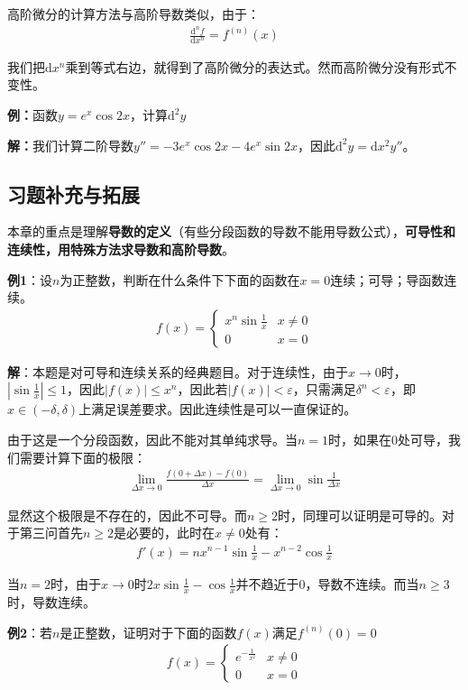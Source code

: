\documentclass{ctexart}
\let\oldtextbf\textbf %
\renewcommand{\textbf}[1]{\textcolor{btex}{\oldtextbf{#1}}} %
\begin{document}
高阶微分的计算方法与高阶导数类似，由于：
\begin{align*}
    \frac{\mathrm{d}^n f}{\mathrm{d}x^n}=f^{(n)}(x)
\end{align*}

我们把$\mathrm{d}x^n$乘到等式右边，就得到了高阶微分的表达式。然而高阶微分没有形式不变性。

\textbf{例：}函数$y=e^x\cos 2x$，计算$\mathrm{d}^2y$

\textbf{解：}我们计算二阶导数$y''=-3e^x\cos 2x-4e^x\sin 2x$，因此$\mathrm{d}^2y=\mathrm{d}x^2 y''$。

\subsection{习题补充与拓展}
本章的重点是理解\textbf{导数的定义}（有些分段函数的导数不能用导数公式），\textbf{可导性和连续性，用特殊方法求导数和高阶导数}。

\textbf{例1}：设$n$为正整数，判断在什么条件下下面的函数在$x=0$连续；可导；导函数连续。
\begin{align*}
    f(x)=\begin{cases}
        x^n\sin\frac{1}{x} & x\neq 0\\
        0 &x=0
    \end{cases}
\end{align*}

\textbf{解}：本题是对可导和连续关系的经典题目。对于连续性，由于$x\to 0$时，$|\sin \frac{1}{x}|\leq 1$，因此$|f(x)|\leq x^n$，因此若$|f(x)|<\varepsilon$，只需满足$\delta^n<\varepsilon$，即$x\in(-\delta,\delta)$上满足误差要求。因此连续性是可以一直保证的。

由于这是一个分段函数，因此不能对其单纯求导。当$n=1$时，如果在0处可导，我们需要计算下面的极限：
\begin{align*}
     \lim_{\Delta x\to 0}\frac{f(0+\Delta x)-f(0)}{\Delta x}=  \lim_{\Delta x\to 0}\sin \frac{1}{\Delta x}
\end{align*}

显然这个极限是不存在的，因此不可导。而$n\geq 2$时，同理可以证明是可导的。对于第三问首先$n\geq 2$是必要的，此时在$x\neq 0$处有：
\begin{align*}
    f'(x)=nx^{n-1}\sin\frac{1}{x}-x^{n-2}\cos\frac{1}{x}
\end{align*}

当$n=2$时，由于$x\to 0$时$2x\sin \frac{1}{x}-\cos\frac{1}{x}$并不趋近于0，导数不连续。而当$n\geq 3$时，导数连续。

\textbf{例2}：若$n$是正整数，证明对于下面的函数$f(x)$满足$f^{(n)}(0)=0$
\begin{align*}
    f(x)=\begin{cases}
        e^{-\frac{1}{x^2}}& x\neq 0\\
        0 & x=0
    \end{cases}
\end{align*}
\end{document}
